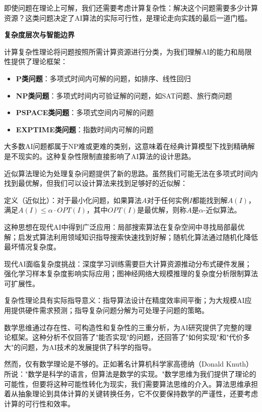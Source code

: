 即使问题在理论上可解，我们还需要考虑计算复杂性：解决这个问题需要多少计算资源？这类问题决定了AI算法的实际可行性，是理论走向实践的最后一道门槛。

\textbf{复杂度层次与智能边界}

计算复杂性理论将问题按照所需计算资源进行分类，为我们理解AI的能力和局限性提供了理论框架：

\begin{itemize}
\item \textbf{P类问题}：多项式时间内可解的问题，如排序、线性回归
\item \textbf{NP类问题}：多项式时间内可验证解的问题，如SAT问题、旅行商问题
\item \textbf{PSPACE类问题}：多项式空间内可解的问题
\item \textbf{EXPTIME类问题}：指数时间内可解的问题
\end{itemize}

大多数AI问题都属于NP难或更难的类别，这意味着在经典计算模型下找到精确解是不现实的。这种复杂性限制直接影响了AI算法的设计思路。

近似算法理论为处理复杂问题提供了新的思路。虽然我们可能无法在多项式时间内找到最优解，但我们可以设计算法来找到足够好的近似解：

定义（近似比）：对于最小化问题，如果算法$A$对于任何实例$I$都能找到解$A(I)$，满足$A(I) \leq \alpha \cdot OPT(I)$，其中$OPT(I)$是最优解，则称$A$是$\alpha$-近似算法。

这种思想在现代AI中得到广泛应用：局部搜索算法在复杂空间中寻找局部最优解；启发式算法利用领域知识指导搜索快速找到好解；随机化算法通过随机化降低最坏情况复杂度。

现代AI面临复杂度挑战：深度学习训练需要巨大计算资源推动分布式硬件发展；强化学习样本复杂度影响实际应用；图神经网络大规模推理的复杂度分析限制算法可扩展性。

复杂性理论具有实际指导意义：指导算法设计在精度效率间平衡；为大规模AI应用提供硬件需求预测；指导复杂问题分解为可处理子问题的策略。

数学思维通过存在性、可构造性和复杂性的三重分析，为AI研究提供了完整的理论框架。这种分析不仅回答了"能否实现"的问题，还回答了"如何实现"和"代价多大"的问题，为AI技术的发展提供了科学的指导。

然而，仅有数学理论是不够的。正如著名计算机科学家高德纳（Donald Knuth）所说："数学是科学的语言，但算法是数学的实现。"数学思维为我们提供了理论的可能性，但要将这种可能性转化为现实，我们需要算法思维的介入。算法思维承担着从抽象理论到具体计算的关键转换任务，它不仅要保持数学的严谨性，还要考虑计算的可行性和效率。

